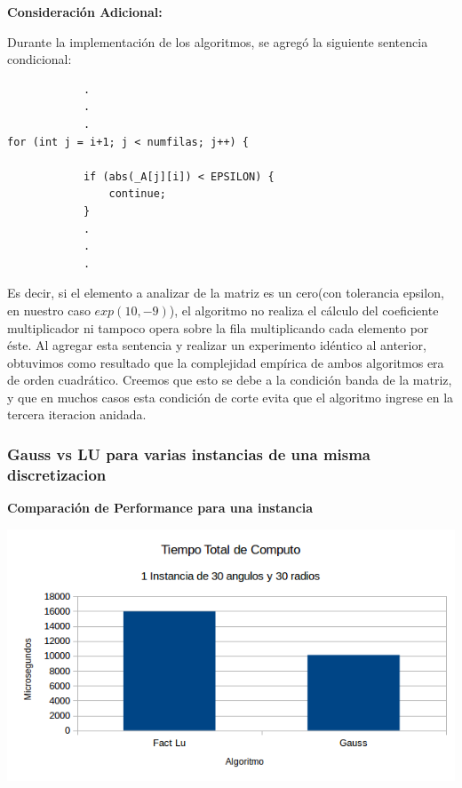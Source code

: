 \textbf{Consideraci\'on Adicional:} 

Durante la implementaci\'on de los algoritmos, se agreg\'o la siguiente sentencia condicional:

\begin{lstlisting}
			.
			.
			.
for (int j = i+1; j < numfilas; j++) {

            if (abs(_A[j][i]) < EPSILON) {
                continue;
            }
			.
			.
			.
\end{lstlisting}

Es decir, si el elemento a analizar de la matriz es un cero(con tolerancia epsilon, en nuestro caso $exp(10, -9)$), el algoritmo no realiza el c\'alculo del coeficiente multiplicador ni tampoco opera sobre la fila multiplicando cada elemento por \'este. Al agregar esta sentencia y realizar un experimento id\'entico al anterior, obtuvimos como resultado que la complejidad emp\'irica de ambos algoritmos era de orden cuadr\'atico. Creemos que esto se debe a la condición banda de la matriz, y que en muchos casos esta condición de corte evita que el algoritmo ingrese en la tercera iteracion anidada.

\subsubsection{Gauss vs LU para varias instancias de una misma discretizacion}


\vspace{0.5cm}

  	\textbf{Comparaci\'on de Performance para una instancia}\\
\begin{center}
\includegraphics[scale=0.7]{experimentos2a_2b/2bUnaInstancia.png}
\end{center}

